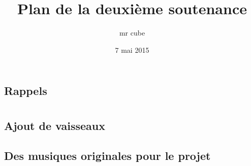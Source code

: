 \documentclass{article}
\title{Plan de la deuxième soutenance}
\author{mr cube}
\date{7 mai 2015}
\begin{document}
\maketitle

\section{}
\subsection{Rappels}

\section{}

\section{}
\subsection{Ajout de vaisseaux}
\subsection{Des musiques originales pour le projet}
\end{document}
